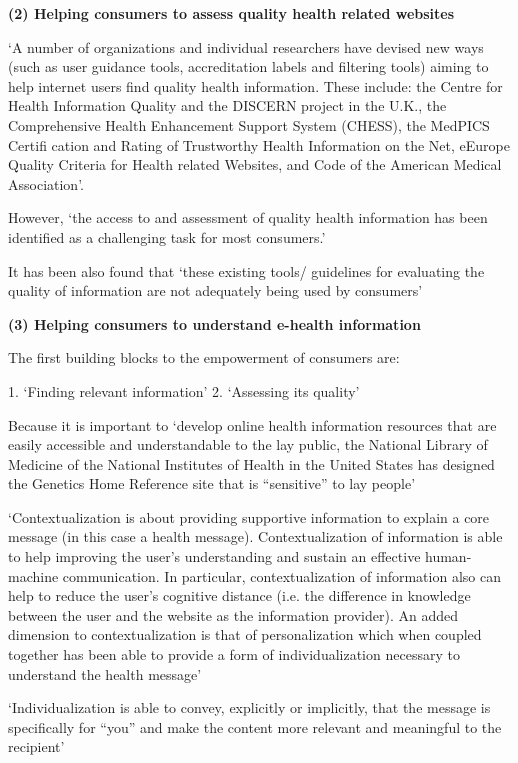 \documentclass[]{article}
\begin{document}
\textbf{(2)	Helping consumers to assess quality health related websites} 

‘A number of organizations and individual researchers have devised new ways (such as user guidance tools, accreditation labels and filtering tools) aiming to help internet users find quality health information. These include: the Centre for Health Information Quality and the DISCERN project in the U.K., the Comprehensive Health Enhancement Support System (CHESS), the MedPICS Certifi cation and Rating of Trustworthy Health Information on the Net, eEurope Quality Criteria for Health related Websites, and Code of the American Medical Association’. 

However, ‘the access to and assessment of quality health information has been identified as a challenging task for most consumers.’

It has been also found that ‘these existing tools/ guidelines for evaluating the quality of information are not adequately being used by consumers’ 

\textbf{(3)	Helping consumers to understand e-health information}

The first building blocks to the empowerment of consumers are: 

1.	‘Finding relevant information’
2.	‘Assessing its quality’

Because it is important to ‘develop online health information resources that are easily accessible and understandable to the lay public, the National Library of Medicine of the National Institutes of Health in the United States has designed the Genetics Home Reference site that is “sensitive” to lay people’
 
‘Contextualization is about providing supportive information to explain a core message (in this case a health message). Contextualization of information is able to help improving the user’s understanding and sustain an effective human-machine communication. In particular, contextualization of information also can help to reduce the user’s cognitive distance (i.e. the difference in knowledge between the user and the website as the information provider). An added dimension to contextualization is that of personalization which when coupled together has been able to provide a form of individualization necessary to understand the health message’ 

‘Individualization is able to convey, explicitly or implicitly, that the message is specifically for “you” and make the content more relevant and meaningful to the recipient’
\end{document}
